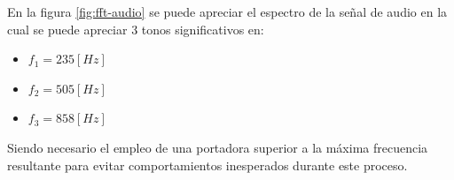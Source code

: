 \documentclass[conference]{IEEEtran}
\begin{document}
	
	En la figura \ref{fig:fft-audio} se puede apreciar el espectro de la señal de audio en la cual se puede apreciar 3 tonos significativos en:
	\begin{itemize}
		\item $f_1 = 235 [Hz] $
		\item $f_2 = 505 [Hz]$
		\item $f_3 = 858 [Hz]$
	\end{itemize}
	
	Siendo necesario el empleo de una portadora superior a la máxima frecuencia resultante para evitar comportamientos inesperados durante este proceso.
	
	\section{  }
	
	
	
\end{document}
